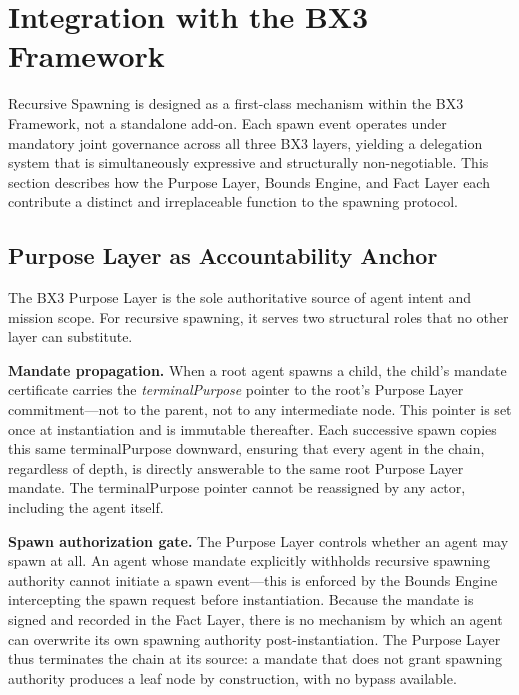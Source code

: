 \section{Integration with the BX3 Framework}
\label{sec:bx3-integration}

Recursive Spawning is designed as a first-class mechanism within the BX3 Framework, not a standalone add-on. Each spawn event operates under mandatory joint governance across all three BX3 layers, yielding a delegation system that is simultaneously expressive and structurally non-negotiable. This section describes how the Purpose Layer, Bounds Engine, and Fact Layer each contribute a distinct and irreplaceable function to the spawning protocol.

\subsection{Purpose Layer as Accountability Anchor}
\label{sec:purpose-layer-anchor}

The BX3 Purpose Layer is the sole authoritative source of agent intent and mission scope. For recursive spawning, it serves two structural roles that no other layer can substitute.

\textbf{Mandate propagation.} When a root agent spawns a child, the child's mandate certificate carries the \emph{terminalPurpose} pointer to the root's Purpose Layer commitment—not to the parent, not to any intermediate node. This pointer is set once at instantiation and is immutable thereafter. Each successive spawn copies this same terminalPurpose downward, ensuring that every agent in the chain, regardless of depth, is directly answerable to the same root Purpose Layer mandate. The terminalPurpose pointer cannot be reassigned by any actor, including the agent itself.

\textbf{Spawn authorization gate.} The Purpose Layer controls whether an agent may spawn at all. An agent whose mandate explicitly withholds recursive spawning authority cannot initiate a spawn event—this is enforced by the Bounds Engine intercepting the spawn request before instantiation. Because the mandate is signed and recorded in the Fact Layer, there is no mechanism by which an agent can overwrite its own spawning authority post-instantiation. The Purpose Layer thus terminates the chain at its source: a mandate that does not grant spawning authority produces a leaf node by construction, with no bypass available.


